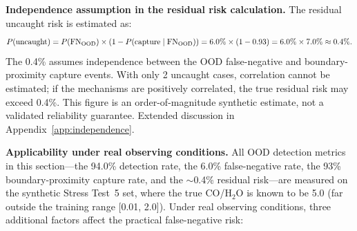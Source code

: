 \documentclass[usenatbib]{mnras}
\begin{document}
\textbf{Independence assumption in the residual risk calculation.} The residual uncaught risk is estimated as:
\begin{equation}\label{eq:residual_risk}
P(\text{uncaught}) = P(\text{FN}_{\rm OOD}) \times (1 - P(\text{capture} \mid \text{FN}_{\rm OOD})) = 6.0\% \times (1 - 0.93) = 6.0\% \times 7.0\% \approx 0.4\%.
\end{equation}
The 0.4\% assumes independence between the OOD false-negative and boundary-proximity capture events. With only 2 uncaught cases, correlation cannot be estimated; if the mechanisms are positively correlated, the true residual risk may exceed 0.4\%. This figure is an order-of-magnitude synthetic estimate, not a validated reliability guarantee. Extended discussion in Appendix~\ref{app:independence}.

\textbf{Applicability under real observing conditions.} All OOD detection metrics in this section---the 94.0\% detection rate, the 6.0\% false-negative rate, the 93\% boundary-proximity capture rate, and the $\sim$0.4\% residual risk---are measured on the synthetic Stress Test~5 set, where the true CO/H$_2$O is known to be 5.0 (far outside the training range [0.01, 2.0]). Under real observing conditions, three additional factors affect the practical false-negative risk:
\end{document}

